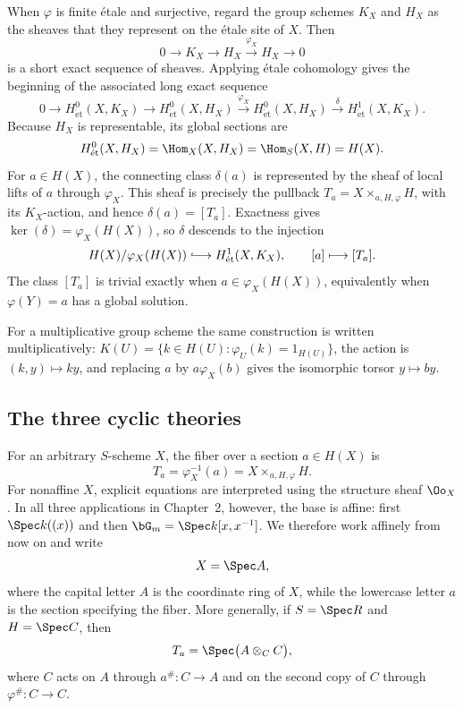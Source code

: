 When $\varphi$ is finite \'etale and surjective, regard the group schemes
$K_X$ and $H_X$ as the sheaves that they represent on the \'etale site of
$X$. Then
\[
0\longrightarrow K_X\longrightarrow H_X
\xrightarrow{\varphi_X}H_X\longrightarrow0
\]
is a short exact sequence of sheaves. Applying \'etale cohomology gives the
beginning of the associated long exact sequence
\[
0\longrightarrow H^0_{\mathrm{\acute et}}(X,K_X)
\longrightarrow H^0_{\mathrm{\acute et}}(X,H_X)
\xrightarrow{\varphi_X}H^0_{\mathrm{\acute et}}(X,H_X)
\xrightarrow{\delta}H^1_{\mathrm{\acute et}}(X,K_X).
\]
Because $H_X$ is representable, its global sections are
\[
H^0_{\mathrm{\acute et}}(X,H_X)
=\Hom_X(X,H_X)
=\Hom_S(X,H)
=H(X).
\]
For $a\in H(X)$, the connecting class $\delta(a)$ is represented by the
sheaf of local lifts of $a$ through $\varphi_X$. This sheaf is precisely the
pullback $T_a=X\times_{a,H,\varphi}H$, with its $K_X$-action, and hence
$\delta(a)=[T_a]$. Exactness gives
$\ker(\delta)=\varphi_X(H(X))$, so $\delta$ descends to the injection
\begin{equation}\label{eq:common_torsor_connecting_map}
H(X)/\varphi_X(H(X))\lhook\joinrel\longrightarrow
H^1_{\mathrm{\acute et}}(X,K_X),
\qquad [a]\longmapsto[T_a].
\end{equation}
The class $[T_a]$ is trivial exactly when $a\in\varphi_X(H(X))$, equivalently
when $\varphi(Y)=a$ has a global solution.

For a multiplicative group scheme the same construction is written
multiplicatively: $K(U)=\{k\in H(U):\varphi_U(k)=1_{H(U)}\}$, the action is
$(k,y)\mapsto ky$, and replacing $a$ by $a\varphi_X(b)$ gives the isomorphic
torsor $y\mapsto by$.

\subsection*{The three cyclic theories}

For an arbitrary $S$-scheme $X$, the fiber over a section $a\in H(X)$ is
\[
T_a=\varphi_X^{-1}(a)
   =X\times_{a,H,\varphi}H.
\]
For nonaffine $X$, explicit equations are interpreted using the structure
sheaf $\Oo_X$. In all three applications in Chapter~2, however, the base is
affine: first $\Spec k((x))$ and then
$\bG_m=\Spec k[x,x^{-1}]$. We therefore work affinely from now on and write
\[
X=\Spec A,
\]
where the capital letter $A$ is the coordinate ring of $X$, while the
lowercase letter $a$ is the section specifying the fiber. More generally, if
$S=\Spec R$ and $H=\Spec C$, then
\[
T_a=\Spec\bigl(A\otimes_C C\bigr),
\]
where $C$ acts on $A$ through $a^\#:C\to A$ and on the second copy of $C$
through $\varphi^\#:C\to C$.

